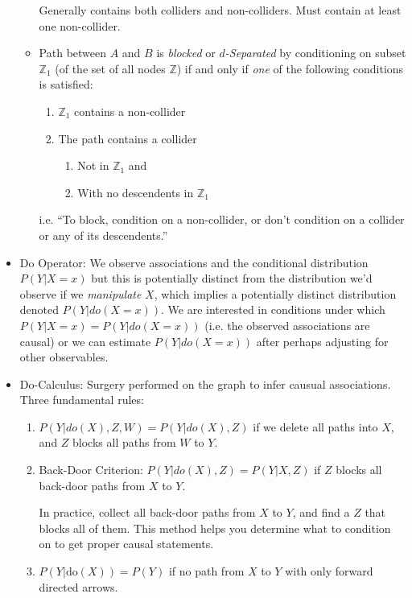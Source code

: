 \documentclass[12pt]{article}
\theoremstyle{plain}
\theoremstyle{definition}
\theoremstyle{remark}
\begin{document}
\begin{itemize}
\begin{itemize}
        Generally contains both colliders and non-colliders.
        Must contain at least one non-collider.
      \item Path between $A$ and $B$ is \emph{blocked} or
        \emph{$d$-Separated} by conditioning on subset $\mathbb{Z}_1$ (of
        the set of all nodes $\mathbb{Z}$) if and only if \emph{one} of
        the following conditions is satisfied:
        \begin{enumerate}[label=(\roman*)]
          \item $\mathbb{Z}_1$ contains a non-collider
          \item The path contains a collider
            \begin{enumerate}[label=(\alph*)]
              \item Not in $\mathbb{Z}_1$ and
              \item With no descendents in $\mathbb{Z}_1$
            \end{enumerate}
        \end{enumerate}
        i.e. ``To block, condition on a non-collider, or don't condition
        on a collider or any of its descendents.''
    \end{itemize}
  \item Do Operator:
    We observe associations and the conditional distribution
    $P(Y|X=x)$ but this is potentially distinct from the distribution
    we'd observe if we \emph{manipulate} $X$, which implies a
    potentially distinct distribution denoted $P(Y|{do}(X=x))$.
    We are interested in conditions under which
    $P(Y|X=x)=P(Y|{do}(X=x))$ (i.e. the observed associations are
    causal) or we can estimate $P(Y|{do}(X=x))$ after perhaps
    adjusting for other observables.
  \item Do-Calculus:
    Surgery performed on the graph to infer causual associations.
    Three fundamental rules:
    \begin{enumerate}
      \item
        $P(Y|do(X),Z,W)=P(Y|do(X),Z)$
        if we delete all paths into $X$, and $Z$ blocks all paths from
        $W$ to $Y$.
      \item Back-Door Criterion:
        $P(Y|do(X),Z)=P(Y|X,Z)$ if $Z$ blocks all back-door paths from
        $X$ to $Y$.

        In practice, collect all back-door paths from $X$ to $Y$, and
        find a $Z$ that blocks all of them.
        This method helps you determine what to condition on to get
        proper causal statements.

      \item $P(Y|\text{do}(X))=P(Y)$ if no path from $X$ to $Y$ with
        only forward directed arrows.
    \end{enumerate}

\end{itemize}
\end{document}

